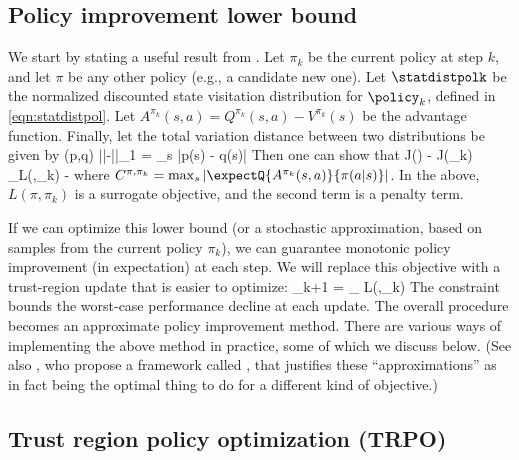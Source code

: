\subsection{Policy improvement lower bound}

We start by stating a useful result from
\citep{Achiam2017}.
Let $\pi_k$ be the current policy at step $k$,
and let $\pi$ be any other policy (e.g., a candidate new one).
Let  $\statdistpolk$ be the normalized
discounted state visitation distribution for $\policy_k$,
defined in \cref{eqn:statdistpol}.
Let $A^{\pi_k}(s,a) = Q^{\pi_k}(s,a)-V^{\pi_k}(s)$
be the advantage function.
Finally, let the total variation distance
between two distributions be
given by
\be
{}(p,q)  \half ||\vp-\vq||_1
= \half \sum_s |p(s) - q(s)| 
\ee
Then one can show \citep{Achiam2017} that
\be
J(\pi) - J(\pi_k)
\geq
_{L(\pi,\pi_k)}
-
\label{eqn:Jlowerbound}
  \ee
where
$C^{\pi,\pi_k} = \max_s |\expectQ{A^{\pi_k}(s,a)}{\pi(a|s)}|$.
In the above, $L(\pi,\pi_k)$ is a  surrogate objective,
and the second term is a penalty term.

If we can optimize this lower bound (or a stochastic approximation,
based on samples from the current policy $\pi_k$),
we can guarantee monotonic policy improvement (in expectation)
at each step.
We will replace this objective with a trust-region update
that is easier to optimize:
\be
\pi_{k+1} = \argmax_{\pi} L(\pi,\pi_k)
\myst   {} \leq
\epsilon
\label{eqn:polImprovementBound}
\ee
The constraint bounds the worst-case performance decline at each
update.
The overall procedure becomes an approximate policy improvement
method.
There are various ways of implementing the above method in practice,
some of which we discuss below.
(See also \citep{Grudzien2022}, who propose a framework
called ,
that justifies these ``approximations'' as in fact being
the optimal thing to do for a different kind of objective.)



\subsection{Trust region policy optimization (TRPO)}
\label{sec:TRPO}



